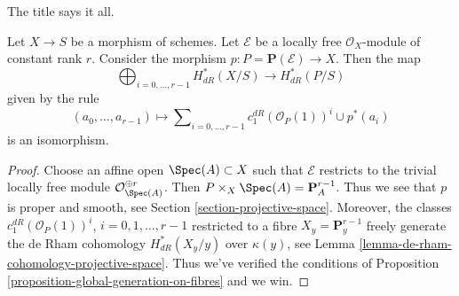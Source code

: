 \noindent
The title says it all.

\begin{proposition}
\label{proposition-projective-space-bundle-formula}
Let $X \to S$ be a morphism of schemes. Let $\mathcal{E}$ be a locally
free $\mathcal{O}_X$-module of constant rank $r$. Consider the morphism
$p : P = \mathbf{P}(\mathcal{E}) \to X$.
Then the map
$$
\bigoplus\nolimits_{i = 0, \ldots, r - 1} H^*_{dR}(X/S)
\longrightarrow
H^*_{dR}(P/S)
$$
given by the rule
$$
(a_0, \ldots, a_{r - 1}) \longmapsto
\sum\nolimits_{i = 0, \ldots, r - 1} c_1^{dR}(\mathcal{O}_P(1))^i \cup p^*(a_i)
$$
is an isomorphism.
\end{proposition}

\begin{proof}
Choose an affine open $\Spec(A) \subset X$ such that $\mathcal{E}$ restricts
to the trivial locally free module $\mathcal{O}_{\Spec(A)}^{\oplus r}$.
Then $P \times_X \Spec(A) = \mathbf{P}^{r - 1}_A$. Thus we see that
$p$ is proper and smooth, see Section \ref{section-projective-space}.
Moreover, the classes $c_1^{dR}(\mathcal{O}_P(1))^i$, $i = 0, 1, \ldots, r - 1$
restricted to a fibre $X_y = \mathbf{P}^{r - 1}_y$ freely generate the
de Rham cohomology $H^*_{dR}(X_y/y)$ over $\kappa(y)$, see
Lemma \ref{lemma-de-rham-cohomology-projective-space}. Thus we've verified the
conditions of Proposition \ref{proposition-global-generation-on-fibres}
and we win.
\end{proof}

